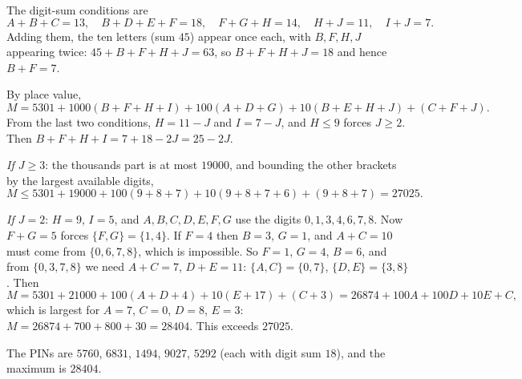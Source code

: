 The digit-sum conditions are
\[A+B+C=13,\quad B+D+E+F=18,\quad F+G+H=14,\quad H+J=11,\quad I+J=7.\]
Adding them, the ten letters (sum $45$) appear once each, with $B,F,H,J$ appearing twice: $45+B+F+H+J=63$, so $B+F+H+J=18$ and hence $B+F=7$.

By place value,
\[M=5301+1000(B+F+H+I)+100(A+D+G)+10(B+E+H+J)+(C+F+J).\]
From the last two conditions, $H=11-J$ and $I=7-J$, and $H\le9$ forces $J\ge2$. Then $B+F+H+I=7+18-2J=25-2J$.

\emph{If $J\ge3$}: the thousands part is at most $19000$, and bounding the other brackets by the largest available digits,
\[M\le5301+19000+100(9+8+7)+10(9+8+7+6)+(9+8+7)=27025.\]

\emph{If $J=2$}: $H=9$, $I=5$, and $A,B,C,D,E,F,G$ use the digits $0,1,3,4,6,7,8$. Now $F+G=5$ forces $\{F,G\}=\{1,4\}$. If $F=4$ then $B=3$, $G=1$, and $A+C=10$ must come from $\{0,6,7,8\}$, which is impossible. So $F=1$, $G=4$, $B=6$, and from $\{0,3,7,8\}$ we need $A+C=7$, $D+E=11$: $\{A,C\}=\{0,7\}$, $\{D,E\}=\{3,8\}$. Then
\[M=5301+21000+100(A+D+4)+10(E+17)+(C+3)=26874+100A+100D+10E+C,\]
which is largest for $A=7$, $C=0$, $D=8$, $E=3$: $M=26874+700+800+30=28404$. This exceeds $27025$.

The PINs are $5760$, $6831$, $1494$, $9027$, $5292$ (each with digit sum $18$), and the maximum is $\boxed{28404}$.
